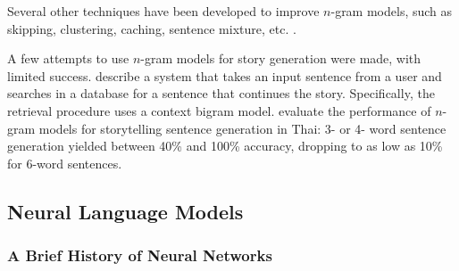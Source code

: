 Several other techniques have been developed to improve $n$-gram models, such as skipping, clustering, caching, sentence mixture, etc. \citep{goodman2001bit}.

A few attempts to use $n$-gram models for story generation were made, with limited success. \citet{swanson2009comparison} describe a system that takes an input sentence from a user and searches in a database for a sentence that continues the story. Specifically, the retrieval procedure uses a context bigram model. \citet{limpanadusadee2014text} evaluate the performance of $n$-gram models for storytelling sentence generation in Thai: 3- or 4- word sentence generation yielded between 40\% and 100\% accuracy, dropping to as low as 10\% for 6-word sentences.

\subsection{Neural Language Models}

\subsubsection{A Brief History of Neural Networks}


